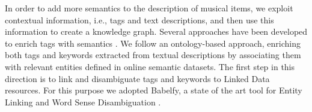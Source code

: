 In order to add more semantics to the description of musical items, we exploit contextual information, i.e., tags and text descriptions, %
and then use this information to create a knowledge graph. 
Several approaches have been developed to enrich tags with semantics \cite{Garcia2012}. We follow an ontology-based approach, enriching both tags and keywords extracted from textual descriptions by associating them with relevant entities defined in online semantic datasets.
The first step in this direction is to link and disambiguate tags and keywords to Linked Data resources. 
For this purpose we adopted Babelfy, a state of the art tool for Entity Linking and Word Sense Disambiguation \cite{Moro2014}. 

